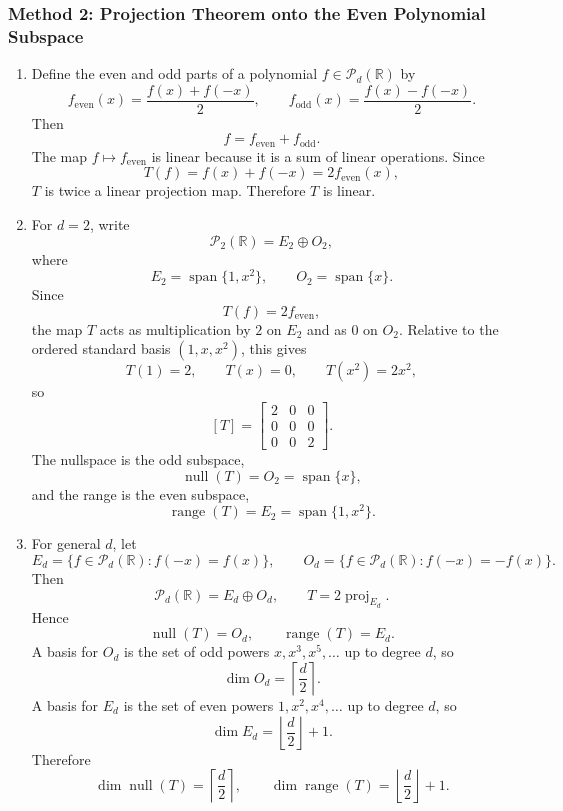 \documentclass[12pt]{article}
\newcommand{\R}{\mathbb{R}}
\newcommand{\Ppoly}{\mathcal{P}}
\newcommand{\Null}{\operatorname{null}}
\newcommand{\Range}{\operatorname{range}}
\newcommand{\Span}{\operatorname{span}}
\begin{document}
\newpage
\subsubsection{Method 2: Projection Theorem onto the Even Polynomial Subspace}
\begin{enumerate}[label=(\alph*)]
  \item Define the even and odd parts of a polynomial $f\in\Ppoly_d(\R)$ by
  \[
  f_{\mathrm{even}}(x)=\frac{f(x)+f(-x)}2,
  \qquad
  f_{\mathrm{odd}}(x)=\frac{f(x)-f(-x)}2.
  \]
  Then
  \[
  f=f_{\mathrm{even}}+f_{\mathrm{odd}}.
  \]
  The map $f\mapsto f_{\mathrm{even}}$ is linear because it is a sum of linear operations. Since
  \[
  T(f)=f(x)+f(-x)=2f_{\mathrm{even}}(x),
  \]
  $T$ is twice a linear projection map. Therefore $T$ is linear.

  \item For $d=2$, write
  \[
  \Ppoly_2(\R)=E_2\oplus O_2,
  \]
  where
  \[
  E_2=\Span\{1,x^2\},
  \qquad
  O_2=\Span\{x\}.
  \]
  Since
  \[
  T(f)=2f_{\mathrm{even}},
  \]
  the map $T$ acts as multiplication by $2$ on $E_2$ and as $0$ on $O_2$. Relative to the ordered standard basis $(1,x,x^2)$, this gives
  \[
  T(1)=2,
  \qquad
  T(x)=0,
  \qquad
  T(x^2)=2x^2,
  \]
  so
  \[
  \boxed{[T]=\begin{bmatrix}
  2&0&0\\
  0&0&0\\
  0&0&2
  \end{bmatrix}.}
  \]
  The nullspace is the odd subspace,
  \[
  \boxed{\Null(T)=O_2=\Span\{x\},}
  \]
  and the range is the even subspace,
  \[
  \boxed{\Range(T)=E_2=\Span\{1,x^2\}.}
  \]

  \item For general $d$, let
  \[
  E_d=\{f\in\Ppoly_d(\R):f(-x)=f(x)\},
  \qquad
  O_d=\{f\in\Ppoly_d(\R):f(-x)=-f(x)\}.
  \]
  Then
  \[
  \Ppoly_d(\R)=E_d\oplus O_d,
  \qquad
  T=2\operatorname{proj}_{E_d}.
  \]
  Hence
  \[
  \Null(T)=O_d,
  \qquad
  \Range(T)=E_d.
  \]
  A basis for $O_d$ is the set of odd powers $x,x^3,x^5,\ldots$ up to degree $d$, so
  \[
  \dim O_d=\left\lceil\frac d2\right\rceil.
  \]
  A basis for $E_d$ is the set of even powers $1,x^2,x^4,\ldots$ up to degree $d$, so
  \[
  \dim E_d=\left\lfloor\frac d2\right\rfloor+1.
  \]
  Therefore
  \[
  \boxed{\dim\Null(T)=\left\lceil\frac d2\right\rceil,
  \qquad
  \dim\Range(T)=\left\lfloor\frac d2\right\rfloor+1.}
  \]
\end{enumerate}

\newpage
\end{document}

